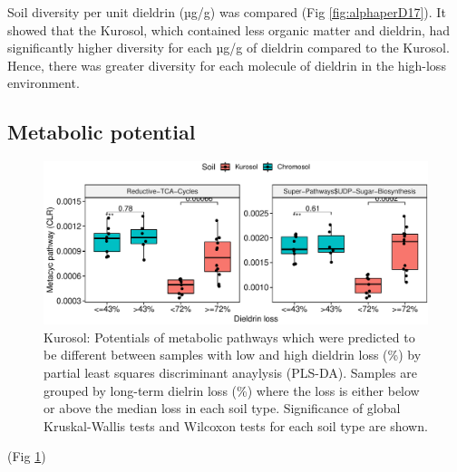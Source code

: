 \documentclass[
]{article}
\begin{document}
Soil diversity per unit dieldrin (µg/g) was compared (Fig \ref{fig:alphaperD17}). It showed that the Kurosol, which contained less organic matter and dieldrin, had significantly higher diversity for each µg/g of dieldrin compared to the Kurosol. Hence, there was greater diversity for each molecule of dieldrin in the high-loss environment.

\hypertarget{metabolic-potential}{%
\subsection{Metabolic potential}\label{metabolic-potential}}

\begin{figure}
\centering
\includegraphics{M2_Results_files/figure-latex/plsdakur-1.pdf}
\caption{\label{fig:plsdakur}Kurosol: Potentials of metabolic pathways which were predicted to be different between samples with low and high dieldrin loss (\%) by partial least squares discriminant anaylysis (PLS-DA). Samples are grouped by long-term dielrin loss (\%) where the loss is either below or above the median loss in each soil type. Significance of global Kruskal-Wallis tests and Wilcoxon tests for each soil type are shown.}
\end{figure}

(Fig \ref{fig:plsdakur})
\end{document}
